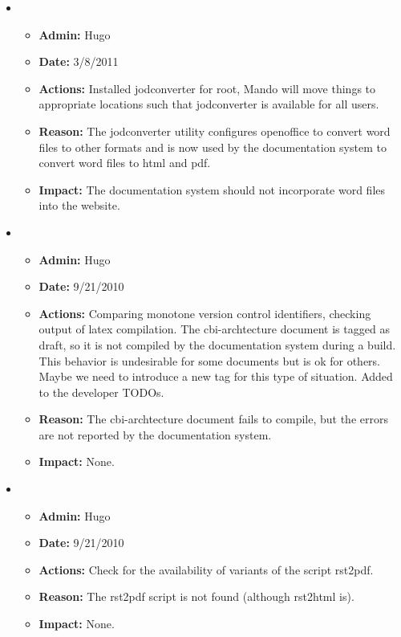 \documentclass[12pt]{article}
\begin{document}
\begin{itemize}

\item 
\begin{itemize}
\item[] {\bf Admin:} Hugo
\item[] {\bf Date:} 3/8/2011 
\item[] {\bf Actions:} Installed jodconverter for root, Mando will move things to appropriate locations such that jodconverter is available for all users.
\item[] {\bf Reason:} The jodconverter utility configures openoffice to convert word files to other formats and is now used by the documentation system to convert word files to html and pdf.
\item[] {\bf Impact:} The documentation system should not incorporate word files into the website.
\end{itemize}

\item 
\begin{itemize}
\item[] {\bf Admin:} Hugo
\item[] {\bf Date:} 9/21/2010 
\item[] {\bf Actions:} Comparing monotone version control identifiers, checking output of latex compilation.  The cbi-archtecture document is tagged as draft, so it is not compiled by the documentation system during a build.  This behavior is undesirable for some documents but is ok for others.  Maybe we need to introduce a new tag for this type of situation.  Added to the developer TODOs.
\item[] {\bf Reason:} The cbi-archtecture document fails to compile, but the errors are not reported by the documentation system.
\item[] {\bf Impact:} None.
\end{itemize}

\item 
\begin{itemize}
\item[] {\bf Admin:} Hugo
\item[] {\bf Date:} 9/21/2010 
\item[] {\bf Actions:} Check for the availability of variants of the
  script rst2pdf.
\item[] {\bf Reason:} The rst2pdf script is not found (although
  rst2html is).
\item[] {\bf Impact:} None.
\end{itemize}


\end{itemize}
\end{document}
